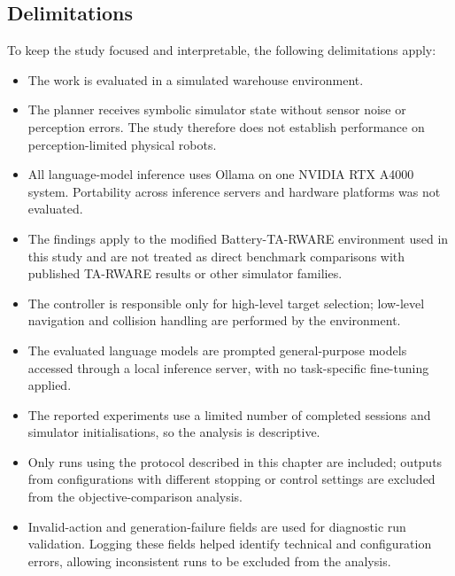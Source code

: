 \subsection{Delimitations}
To keep the study focused and interpretable, the following delimitations apply:
\begin{itemize}
    \item The work is evaluated in a simulated warehouse environment.
    \item The planner receives symbolic simulator state without sensor noise or perception errors. The study therefore does not establish performance on perception-limited physical robots.
    \item All language-model inference uses Ollama on one NVIDIA RTX A4000 system. Portability across inference servers and hardware platforms was not evaluated.
    \item The findings apply to the modified Battery-TA-RWARE environment used in this study and are not treated as direct benchmark comparisons with published TA-RWARE results or other simulator families.
    \item The controller is responsible only for high-level target selection; low-level navigation and collision handling are performed by the environment.
    \item The evaluated language models are prompted general-purpose models accessed through a local inference server, with no task-specific fine-tuning applied.
    \item The reported experiments use a limited number of completed sessions and simulator initialisations, so the analysis is descriptive.
    \item Only runs using the protocol described in this chapter are included; outputs from configurations with different stopping or control settings are excluded from the objective-comparison analysis.
    \item Invalid-action and generation-failure fields are used for diagnostic run validation. Logging these fields helped identify technical and configuration errors, allowing inconsistent runs to be excluded from the analysis.
\end{itemize}
